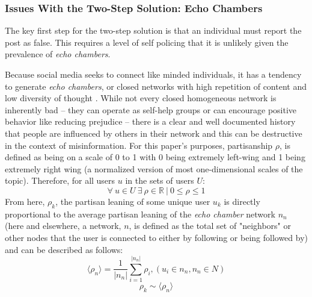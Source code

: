 \documentclass[preprint,review,12pt]{elsarticle}
\begin{document}
\subsubsection{Issues With the Two-Step Solution: Echo Chambers}
\label{sec: echo chambers}
 The key first step for the two-step solution is that an individual must report the post as false. This requires a level of self policing that it is unlikely given the prevalence of \textit{echo chambers}. 
 
Because social media seeks to connect like minded individuals, it has a tendency to generate \textit{echo chambers}, or closed networks with high repetition of content and low diversity of thought \cite{adibi2005proceedings, bastian2009international, pariser2011filter,bozdag2015breaking}. While not every closed homogeneous network is inherently bad -- they can operate as self-help groups \cite{kast2012under} or can encourage positive behavior like reducing prejudice \cite{paluck2011peer} -- there is a clear and well documented history that people are influenced by others in their network \cite{cialdini2004social,bollinger2012peer, bond201261,gerber2008social,gerber2009descriptive,meer2011brother,paluck2012salience,del2016spreading,bessi2015viral,friedkin1984structural,marsden1993network} and this can be destructive in the context of misinformation. For this paper's purposes, partisanship $\rho$, is defined as being on a scale of 0 to 1 with 0 being extremely left-wing and 1 being extremely right wing (a normalized version of most one-dimensional scales of the topic). Therefore, for all users $u$ in the sets of users $U$:
\begin{equation}
\label{basepartisanship}
    \forall \ u \in U \ \exists \ \rho \in \mathbb{R} \ | \ 0 \leq \rho \leq 1
\end{equation}
From here, $\rho_k$, the partisan leaning of some unique user $u_k$ is directly proportional to the average partisan leaning of the \textit{echo chamber} network $n_n$ (here and elsewhere, a network, $n$, is defined as the total set of "neighbors" or other nodes that the user is connected to either by following or being followed by) and can be described as follows:
 \begin{equation}
    \label{ech chamber}
        \langle \rho_n \rangle = \frac{1}{|n_n|}\sum_{i=1}^{|n_n|}{\rho_i}, (u_i \in n_n, n_n \in N)
 \end{equation}
 \begin{equation}
    \label{leaningproportionaltonetwork}
        \rho_k \sim \langle \rho_n \rangle
 \end{equation}
 
\end{document}
